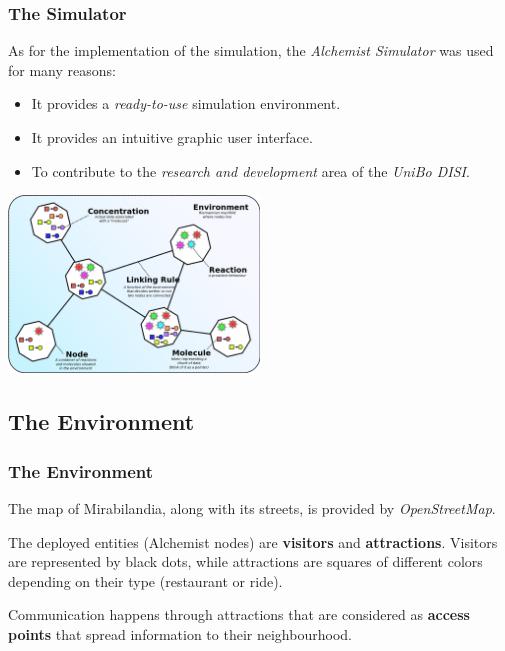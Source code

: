 \begin{frame}
    \frametitle{The Simulator}
    As for the implementation of the simulation, the \textit{Alchemist Simulator} was used for many reasons:
    \begin{itemize}
        \item It provides a \textit{ready-to-use} simulation environment.
        \item It provides an intuitive graphic user interface.
        \item To contribute to the \textit{research and development} area of the \textit{UniBo DISI}.
    \end{itemize}

    \bigskip

    \begin{center}
        \includegraphics[width=0.5\textwidth]{../img/model}
        \label{fig:model}
    \end{center}

\end{frame}

\subsection{The Environment}\label{subsec:the-environment}

\begin{frame}
    \frametitle{The Environment}
    The map of Mirabilandia, along with its streets, is provided by \textit{OpenStreetMap}.

    \bigskip

    The deployed entities (Alchemist nodes) are \textbf{visitors} and \textbf{attractions}.
    Visitors are represented by black dots, while attractions are squares of different colors depending on their type (restaurant or ride).

    \bigskip

    Communication happens through attractions that are considered as \textbf{access points} that spread information to their neighbourhood.

\end{frame}

